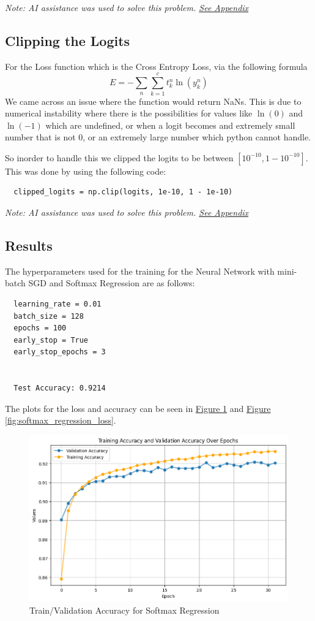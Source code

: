 \documentclass{article}
\begin{document}
\emph{Note: AI assistance was used to solve this problem. \hyperref[sec:appendix:softmax_overflow-ai]{See Appendix}} 

\subsection{Clipping the Logits}
For the Loss function which is the Cross Entropy Loss, via the following formula
\begin{equation*}
  E = -\sum_n \sum_{k = 1}^{c} t_k^n \ln(y_k^n)
\end{equation*}
We came across an issue where the function would return NaNs.
This is due to numerical instability where there is the possibilities 
for values like $\ln(0)$ and $\ln(-1)$ which are undefined, or when a 
logit becomes and extremely small number that is not 0, or an extremely
large number which python cannot handle.

So inorder to handle this we clipped the logits to be between $[10^{-10}, 1 - 10^{-10}]$.
This was done by using the following code:
\begin{verbatim}
  clipped_logits = np.clip(logits, 1e-10, 1 - 1e-10)
\end{verbatim}

\emph{Note: AI assistance was used to solve this problem. \hyperref[sec:appendix:clipping_logits-ai]{See Appendix}} 

\subsection*{Results}
The hyperparameters used for the training for the Neural Network with 
mini-batch SGD and Softmax Regression are as follows:
\begin{verbatim}
  learning_rate = 0.01
  batch_size = 128
  epochs = 100
  early_stop = True
  early_stop_epochs = 3


  Test Accuracy: 0.9214
\end{verbatim}

The plots for the loss and accuracy can be seen in
\hyperref[fig:softmax_regression_acc]{Figure \ref{fig:softmax_regression_acc}} and
\hyperref[fig:softmax_regression_loss]{Figure \ref{fig:softmax_regression_loss}}.

\begin{figure}[h]
  \centering
  \includegraphics[width=0.8\linewidth]{include/softmax-train-val-acc.png}
  \caption{Train/Validation Accuracy for Softmax Regression}
  \label{fig:softmax_regression_acc}
\end{figure}
\end{document}
